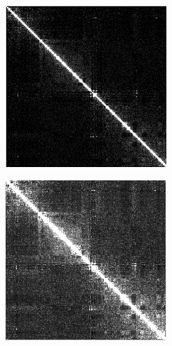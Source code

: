 \documentclass{beamer}
\begin{document}
\begin{frame}
\begin{figure}[H]
\begin{subfigure}[b]{.25\textwidth}
            \caption{}
            \label{fig:pearson}
        \end{subfigure}
        \begin{subfigure}[b]{.25\textwidth}
            \includegraphics[width=\textwidth]{figures/scn.png}
            \caption{}
            \label{fig:scn}
        \end{subfigure}
        \begin{subfigure}[b]{.25\textwidth}
            \includegraphics[width=\textwidth]{figures/scn+pearson.png}

\end{subfigure}
\end{figure}
\end{frame}
\end{document}
